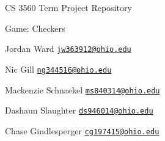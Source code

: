 CS 3560 Term Project Repository

Game\+: Checkers

Jordan Ward \href{mailto:jw363912@ohio.edu}{\tt jw363912@ohio.\+edu}

Nic Gill \href{mailto:ng344516@ohio.edu}{\tt ng344516@ohio.\+edu}

Mackenzie Schnaekel \href{mailto:ms840314@ohio.edu}{\tt ms840314@ohio.\+edu}

Dashaun Slaughter \href{mailto:ds946014@ohio.edu}{\tt ds946014@ohio.\+edu}

Chase Gindlesperger \href{mailto:cg197415@ohio.edu}{\tt cg197415@ohio.\+edu} 